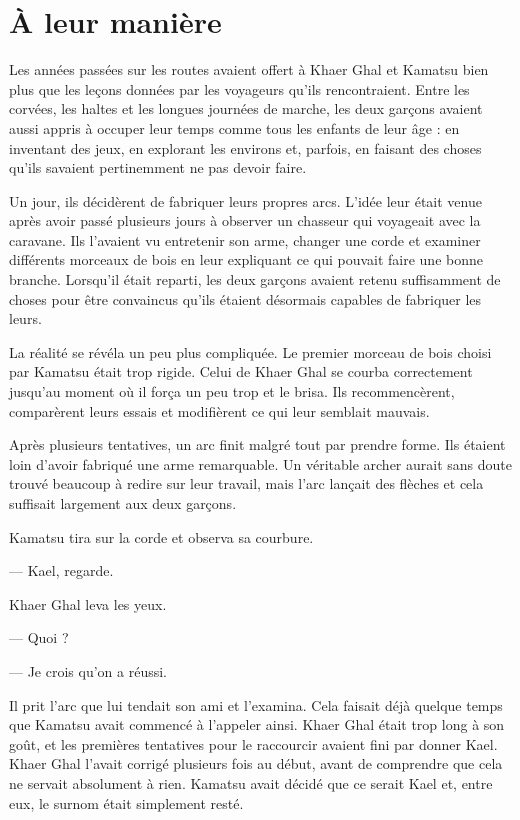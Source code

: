 \chapter{À leur manière}

Les années passées sur les routes avaient offert à Khaer Ghal et Kamatsu bien
plus que les leçons données par les voyageurs qu'ils rencontraient. Entre les
corvées, les haltes et les longues journées de marche, les deux garçons avaient
aussi appris à occuper leur temps comme tous les enfants de leur âge : en
inventant des jeux, en explorant les environs et, parfois, en faisant des choses
qu'ils savaient pertinemment ne pas devoir faire.

Un jour, ils décidèrent de fabriquer leurs propres arcs. L'idée leur était
venue après avoir passé plusieurs jours à observer un chasseur qui voyageait
avec la caravane. Ils l'avaient vu entretenir son arme, changer une corde et
examiner différents morceaux de bois en leur expliquant ce qui pouvait faire
une bonne branche. Lorsqu'il était reparti, les deux garçons avaient retenu
suffisamment de choses pour être convaincus qu'ils étaient désormais capables
de fabriquer les leurs.

La réalité se révéla un peu plus compliquée. Le premier morceau de bois choisi
par Kamatsu était trop rigide. Celui de Khaer Ghal se courba correctement
jusqu'au moment où il força un peu trop et le brisa. Ils recommencèrent,
comparèrent leurs essais et modifièrent ce qui leur semblait mauvais.

Après plusieurs tentatives, un arc finit malgré tout par prendre forme. Ils
étaient loin d'avoir fabriqué une arme remarquable. Un véritable archer aurait
sans doute trouvé beaucoup à redire sur leur travail, mais l'arc lançait des
flèches et cela suffisait largement aux deux garçons.

Kamatsu tira sur la corde et observa sa courbure.

— Kael, regarde.

Khaer Ghal leva les yeux.

— Quoi ?

— Je crois qu'on a réussi.

Il prit l'arc que lui tendait son ami et l'examina. Cela faisait déjà quelque
temps que Kamatsu avait commencé à l'appeler ainsi. Khaer Ghal était trop long
à son goût, et les premières tentatives pour le raccourcir avaient fini par
donner Kael. Khaer Ghal l'avait corrigé plusieurs fois au début, avant de
comprendre que cela ne servait absolument à rien. Kamatsu avait décidé que ce
serait Kael et, entre eux, le surnom était simplement resté.

